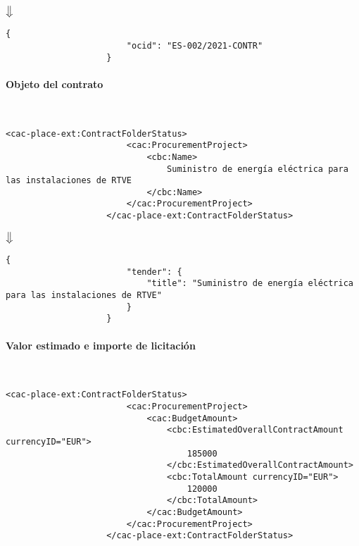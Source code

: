                 \begin{center}
                    $\big\Downarrow$
                \end{center}
                
                \begin{lstlisting}[language=lJSON]
                    {
                        "ocid": "ES-002/2021-CONTR"
                    }
                \end{lstlisting}
                
            \paragraph{Objeto del contrato} \mbox{}\\
                \begin{lstlisting}[language=lXML]
                    <cac-place-ext:ContractFolderStatus>
                        <cac:ProcurementProject>
                            <cbc:Name>
                                Suministro de energía eléctrica para las instalaciones de RTVE
                            </cbc:Name>
                        </cac:ProcurementProject>
                    </cac-place-ext:ContractFolderStatus>
                \end{lstlisting}
                
                \begin{center}
                    $\big\Downarrow$
                \end{center}
                
                \begin{lstlisting}[language=lJSON]
                    {
                        "tender": {
                            "title": "Suministro de energía eléctrica para las instalaciones de RTVE"
                        }
                    }
                \end{lstlisting}
                
            \paragraph{Valor estimado e importe de licitación} \mbox{}\\
                \begin{lstlisting}[language=lXML]
                    <cac-place-ext:ContractFolderStatus>
                        <cac:ProcurementProject>
                            <cac:BudgetAmount>
                                <cbc:EstimatedOverallContractAmount currencyID="EUR">
                                    185000
                                </cbc:EstimatedOverallContractAmount>
                                <cbc:TotalAmount currencyID="EUR">
                                    120000
                                </cbc:TotalAmount>
                            </cac:BudgetAmount>
                        </cac:ProcurementProject>
                    </cac-place-ext:ContractFolderStatus>
                \end{lstlisting}
                
